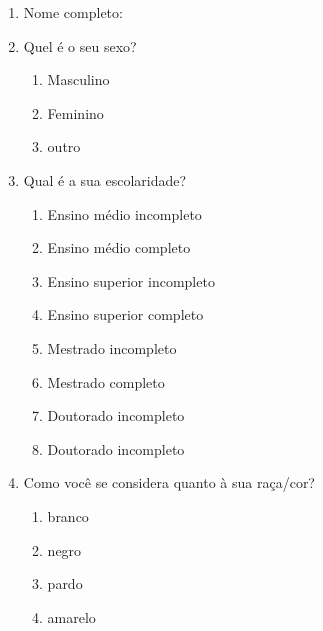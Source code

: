 \documentclass[a4paper, 12pt, openright, oneside, german, french, english, brazil]{abntex2}
\begin{document}
	\begin{enumerate}

		\item Nome completo:



		\item Quel é o seu sexo?

		\begin{enumerate}

			\item Masculino

			\item Feminino

			\item outro

		\end{enumerate}

		\item Qual é a sua escolaridade?

		\begin{enumerate}

			\item Ensino médio incompleto

			\item Ensino médio completo

			\item Ensino superior incompleto

			\item Ensino superior completo

			\item Mestrado incompleto

			\item Mestrado completo

			\item Doutorado incompleto

			\item Doutorado incompleto

		\end{enumerate}

		\item Como você se considera quanto à sua raça/cor?

		\begin{enumerate}

			\item branco

			\item negro

			\item pardo

			\item amarelo


\end{enumerate}
\end{enumerate}
\end{document}

